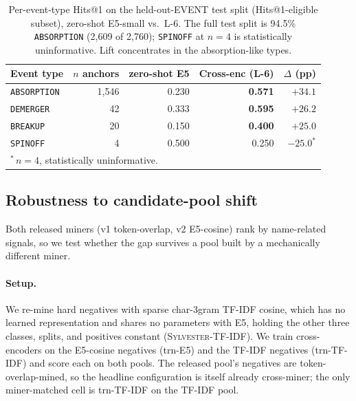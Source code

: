 \documentclass[sigconf]{acmart}
\begin{document}
\begin{table}[t]
  \centering
  \footnotesize
  \caption{Per-event-type Hits@1 on the held-out-EVENT test split
    (Hits@1-eligible subset), zero-shot E5-small vs.\ L-6. The full
    test split is 94.5\% \texttt{ABSORPTION} (2{,}609 of 2{,}760);
    \texttt{SPINOFF} at $n{=}4$ is statistically uninformative. Lift
    concentrates in the absorption-like types.}
  \label{tab:event_split_breakdown}
  \begin{tabular}{lrrrr}
    \toprule
    Event type & $n$ anchors & zero-shot E5 & Cross-enc (L-6) & $\Delta$ (pp) \\
    \midrule
    \texttt{ABSORPTION} & 1{,}546 & 0.230 & \textbf{0.571} & $+34.1$ \\
    \texttt{DEMERGER}   &    42   & 0.333 & \textbf{0.595} & $+26.2$ \\
    \texttt{BREAKUP}    &    20   & 0.150 & \textbf{0.400} & $+25.0$ \\
    \texttt{SPINOFF}    &     4   & 0.500 & 0.250 & $-25.0^{*}$ \\
    \bottomrule
    \multicolumn{5}{l}{\scriptsize $^{*}$\,$n{=}4$, statistically uninformative.}
  \end{tabular}
\end{table}

\subsection{Robustness to candidate-pool shift}
\label{ssec:robustness}

Both released miners (v1 token-overlap, v2 E5-cosine) rank by
name-related signals, so we test whether the gap survives a pool
built by a mechanically different miner.

\paragraph{Setup.} We re-mine hard negatives with sparse
char-3gram TF-IDF cosine, which has no learned representation and
shares no parameters with E5, holding the other three classes,
splits, and positives constant (\textsc{Sylvester-TF-IDF}). We train
cross-encoders on the E5-cosine negatives (trn-E5) and the TF-IDF
negatives (trn-TF-IDF) and score each on both pools. The released
pool's negatives are token-overlap-mined, so the headline
configuration is itself already cross-miner; the only miner-matched
cell is trn-TF-IDF on the TF-IDF pool.
\end{document}
